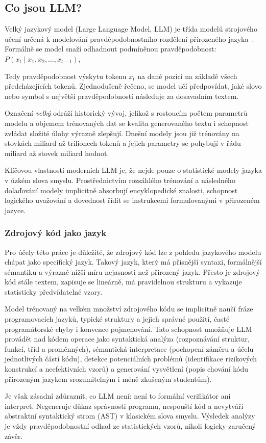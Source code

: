 \subsection{Co jsou LLM?}
\label{subsec:llm-about}

Velký jazykový model (Large Language Model, LLM) je třída modelů strojového učení určená k modelování pravděpodobnostního rozdělení přirozeného jazyka~\cite{redhat-llm,jelodar-llmsourcecode}.
Formálně se model snaží odhadnout podmíněnou pravděpodobnost: $P(x_t \mid x_1, x_2, \ldots, x_{t-1}), \label{eq:llm-probability}$

Tedy pravděpodobnost výskytu tokenu $x_t$ na dané pozici na základě všech předcházejících tokenů.
Zjednodušeně řečeno, se model učí předpovídat, jaké slovo nebo symbol s největší pravděpodobností následuje za dosavadním textem.

Označení \textit{velký} odráží historický vývoj, jelikož s rostoucím počtem parametrů modelu a objemem trénovaných dat se kvalita generovaného textu i schopnost zvládat složité úlohy výrazně zlepšují.
Dnešní modely jsou již trénovány na stovkách miliard až trilionech tokenů a jejich parametry se pohybují v řádu miliard až stovek miliard hodnot.

Klíčovou vlastností moderních LLM je, že nejde pouze o statistické modely jazyka v úzkém slova smyslu.
Prostřednictvím rozsáhlého trénování a následného dolaďování modely implicitně absorbují encyklopedické znalosti, schopnost logického uvažování a dovednost řídit se instrukcemi formulovanými v přirozeném jazyce.

\subsubsection*{Zdrojový kód jako jazyk}
\label{subsubsec:code-as-language}

Pro účely této práce je důležité, že zdrojový kód lze z pohledu jazykového modelu chápat jako specifický jazyk.
Takový jazyk, který má přísnější syntaxi, formálnější sémantiku a výrazně nižší míru nejasnosti než přirozený jazyk.
Přesto je zdrojový kód stále textem, zapisuje se lineárně, má pravidelnou strukturu a vykazuje statisticky předvídatelné vzory.

Model trénovaný na velkém množství zdrojového kódu se implicitně naučí fráze programovacích jazyků, typické struktury a jejich správné použití, časté programátorské chyby i konvence pojmenování.
Tato schopnost umožňuje LLM provádět nad kódem operace jako syntaktická analýza (rozpoznávání struktur, funkcí, tříd a proměnných), sémantická interpretace (pochopení záměru a účelu jednotlivých částí kódu), detekce potenciálních problémů (identifikace rizikových konstrukcí a neefektivních vzorů) a generování vysvětlení (popis chování kódu přirozeným jazykem srozumitelným i méně zkušeným studentům).

Je však zásadní zdůraznit, co LLM není: není to formální verifikátor ani interpret.
Negeneruje důkaz správnosti programu, nespouští kód a nevytváří abstraktní syntaktický strom (AST) v klasickém slova smyslu.
Výsledek analýzy je vždy pravděpodobnostní odhad ze statistických vzorů, nikoli logicky zaručený závěr.

\endinput